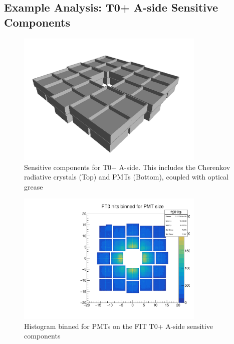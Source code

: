 \subsection{Example Analysis: T0+ A-side Sensitive Components}
\begin{figure}[H]
    \centering
    \includegraphics[width=0.8\textwidth]{figures/FIT/T0+_Sensitive_Components.png}
    \caption{Sensitive components for T0+ A-side. This includes the Cherenkov radiative crystals (Top) and PMTs (Bottom), coupled with optical grease}
    \label{fig:my_label}
\end{figure}

\begin{figure}[H]
    \centering
    \includegraphics[width= 0.8\textwidth]{figures/analysis/T0+_Sensitive_Components.pdf}
    \caption{Histogram binned for PMTs on the FIT T0+ A-side sensitive components}
    \label{fig:sensitive_components}
\end{figure}
